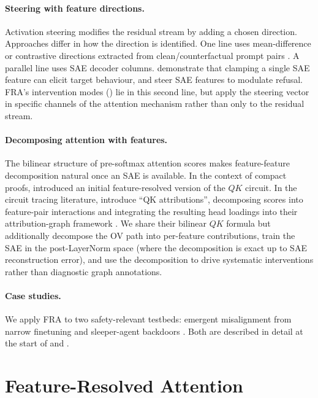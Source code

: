 \documentclass{article}
\theoremstyle{plain}
\theoremstyle{definition}
\theoremstyle{remark}
\begin{document}
\paragraph{Steering with feature directions.} Activation steering modifies the residual stream by adding a chosen direction. Approaches differ in how the direction is identified. One line uses mean-difference or contrastive directions extracted from clean/counterfactual prompt pairs \citep{turner2023activation,panickssery2023steering}. A parallel line uses SAE decoder columns. \citet{templeton2024scaling} demonstrate that clamping a single SAE feature can elicit target behaviour, and \citet{obrien2024steering} steer SAE features to modulate refusal. FRA's intervention modes () lie in this second line, but apply the steering vector in specific channels of the attention mechanism rather than only to the residual stream.

\paragraph{Decomposing attention with features.} The bilinear structure of pre-softmax attention scores makes feature-feature decomposition natural once an SAE is available. In the context of compact proofs, \citep{featints_compact_2025} introduced an initial feature-resolved version of the $QK$ circuit. In the circuit tracing literature, \citet{kamath2025tracing} introduce ``QK attributions'', decomposing scores into feature-pair interactions and integrating the resulting head loadings into their attribution-graph framework \citep{lindsey2025biology}. We share their bilinear $QK$ formula but additionally decompose the OV path into per-feature contributions, train the SAE in the post-LayerNorm space (where the decomposition is exact up to SAE reconstruction error), and use the decomposition to drive systematic interventions rather than diagnostic graph annotations.
\paragraph{Case studies.} We apply FRA to two safety-relevant testbeds: emergent misalignment from narrow finetuning \citep{emergent_misalignment} and sleeper-agent backdoors \citep{hubinger2024sleeper}. Both are described in detail at the start of  and .

\section{Feature-Resolved Attention}
\label{sec:fra}
\end{document}
